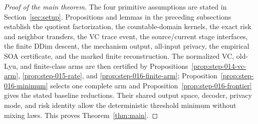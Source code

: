 \begin{proof}[Proof of the main theorem]
The four primitive assumptions are stated in Section~\ref{sec:setup}. Propositions and lemmas in the preceding subsections establish the quotient factorization, the countable-domain kernels, the exact risk and neighbor transfers, the VC trace event, the source/current stage interfaces, the finite DDim descent, the mechanism output, all-input privacy, the empirical SOA certificate, and the marked finite reconstruction. The normalized VC, old-Lyu, and finite-class arms are then certified by Propositions~\ref{prop:step-014-vc-arm}, \ref{prop:step-015-rate}, and \ref{prop:step-016-finite-arm}; Proposition~\ref{prop:step-016-minimum} selects one complete arm and Proposition~\ref{prop:step-016-frontier} gives the stated baseline reductions. Their shared output space, decoder, privacy mode, and risk identity allow the deterministic threshold minimum without mixing laws. This proves Theorem~\ref{thm:main}.
\end{proof}
